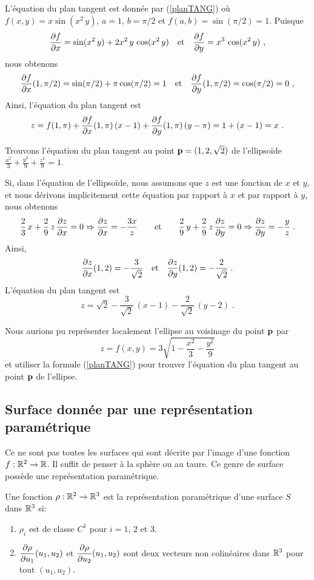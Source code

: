 {\begin{egg}
L'équation du plan tangent est donnée par (\ref{planTANG}) où
$f(x,y)=x\sin(x^2\,y)$, $a=1$, $b=\pi/2$ et $f(a,b) = \sin(\pi/2) =1$.
Puisque
\[
\frac{\partial f}{\partial x} = \sin(x^2\,y) + 2x^2\, y\,\cos(x^2\,y)
\quad \text{et} \quad
\frac{\partial f}{\partial y} = x^3\,\cos(x^2\,y) \ ,
\]
nous obtenons
\[
\frac{\partial f}{\partial x}(1,\pi/2) = \sin(\pi/2) + \pi \cos(\pi/2) = 1
\quad  \text{et} \quad
\frac{\partial f}{\partial y}(1,\pi/2) = \cos(\pi/2) =0 \ ,
\]
Ainsi, l'équation du plan tangent est
\[
z = f(1,\pi) + \frac{\partial f}{\partial x}(1,\pi) \, (x - 1)
+ \frac{\partial f}{\partial y}(1,\pi) \, (y - \pi)
= 1 + (x-1) = x \ .
\]
\end{egg}

\begin{egg}
Trouvons l'équation du plan tangent au point
$\mathbf{p} = (1,2,\sqrt{2})$ de l'ellipsoïde
$\displaystyle \frac{x^2}{3} + \frac{y^2}{9} + \frac{z^2}{9} = 1$.

Si, dans l'équation de l'ellipsoïde, nous assumons que $z$ est une fonction de
$x$ et $y$, et nous dérivons implicitement cette équation par rapport à $x$ et
par rapport à $y$, nous obtenons
\[
\frac{2}{3}\,x + \frac{2}{9}\,z\,\frac{\partial z}{\partial x} = 0
\Rightarrow \frac{\partial z}{\partial x} = -\frac{3x}{z}
\qquad \text{et} \qquad
\frac{2}{9}\,y + \frac{2}{9} \,z \, \frac{\partial z}{\partial y} = 0
\Rightarrow \frac{\partial z}{\partial y} = -\frac{y}{z} \; .
\]
Ainsi,
\[
\frac{\partial z}{\partial x}(1,2) = -\frac{3}{\sqrt{2}} \quad \text{et} \quad
\frac{\partial z}{\partial y}(1,2) = -\frac{2}{\sqrt{2}} \; .
\]
L'équation du plan tangent est
\[
z = \sqrt{2} -\frac{3}{\sqrt{2}}\,(x-1)
- \frac{2}{\sqrt{2}}\,(y-2) \; .
\]

Nous aurions pu représenter localement l'ellipse au voisinage du point
$\mathbf{p}$ par
\[
  z = f(x,y) = 3 \sqrt{1 - \frac{x^2}{3} - \frac{y^2}{9}}
\]
et utiliser la formule (\ref{planTANG}) pour trouver l'équation du
plan tangent au point $\mathbf{p}$ de l'ellipse.
\label{TPellipsoide}
\end{egg}

\subsection{Surface donnée par une représentation paramétrique}

Ce ne sont pas toutes les surfaces qui sont décrite par l'image d'une
fonction $f:\mathbb{R}^2 \to \mathbb{R}$.  Il suffit de penser à la sphère ou au
taure.  Ce genre de surface possède une représentation
paramétrique.

\begin{defn} 
Une fonction $\rho :\mathbb{R}^2 \to \mathbb{R}^3$ est la représentation
paramétrique d'une surface $S$ dans $\mathbb{R}^3$ si:
\begin{enumerate}
\item $\rho_i$ est de classe $C^1$ pour $i=1$, $2$ et $3$.
\item $\displaystyle \frac{\partial \rho}{\partial u_1}(u_1,u_2)$ et
$\displaystyle \frac{\partial \rho}{\partial u_2}(u_1,u_2)$ sont deux vecteurs
non colinéaires dans $\mathbb{R}^3$ pour tout $(u_1,u_2)$. 
\end{enumerate}
\end{defn}

}
